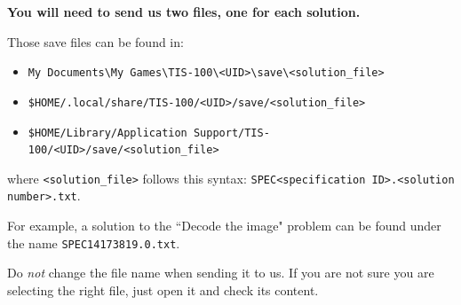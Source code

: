 \documentclass[10pt,a4paper]{article}
\theoremstyle{definition}%
\newtheorem{Q}{Question}[] %
\begin{document}
\textbf{You will need to send us two  files, one for each solution.}

Those save files can be found in:
\begin{itemize}
	\item[\faWindows] \verb|My Documents\My Games\TIS-100\<UID>\save\<solution_file>|
	\item[\faLinux] \verb|$HOME/.local/share/TIS-100/<UID>/save/<solution_file>|
	\item[\faApple] \verb|$HOME/Library/Application Support/TIS-100/<UID>/save/<solution_file>|
\end{itemize}
where \texttt{<solution\_file>} follows this syntax: \texttt{SPEC<specification ID>.<solution number>.txt}.

For example, a solution to the ``Decode the image" problem can be found under the name \texttt{SPEC14173819.0.txt}.

Do \textit{not} change the file name when sending it to us.
If you are not sure you are selecting the right file, just open it and check its content.

\end{document}
